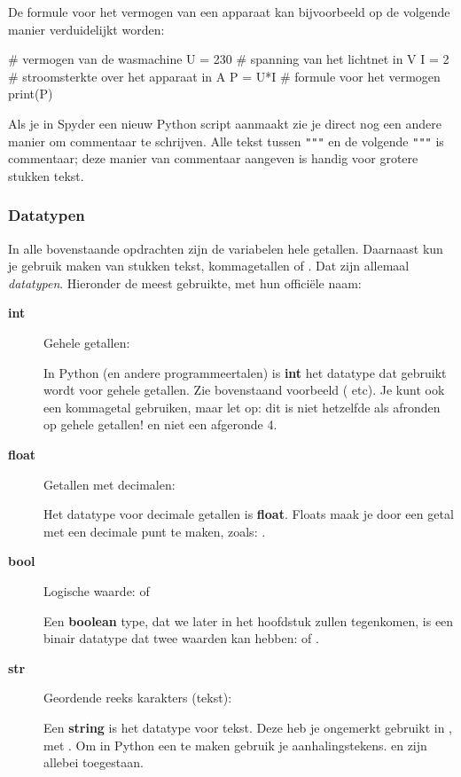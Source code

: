 \documentclass[a4paper,11pt, fleqn]{article}
\begin{document}
De formule voor het vermogen van een apparaat kan bijvoorbeeld op de volgende manier verduidelijkt worden:
\begin{python}
# vermogen van de wasmachine
U = 230	   # spanning van het lichtnet in V
I  = 2     # stroomsterkte over het apparaat in A
P = U*I    # formule voor het vermogen
print(P)
\end{python}

Als je in Spyder een nieuw Python script aanmaakt zie je direct nog een andere manier om commentaar te schrijven. Alle tekst tussen \verb,""", en de volgende \verb,""", is commentaar; deze manier van commentaar aangeven is handig voor grotere stukken tekst. 

\subsubsection{Datatypen}
In alle bovenstaande opdrachten zijn de variabelen hele getallen. Daarnaast kun je gebruik maken van stukken tekst, kommagetallen of . Dat zijn allemaal {\it datatypen}. Hieronder de meest gebruikte, met hun offici\"ele naam:

\begin{description}
\item[\textbf{int}] Gehele getallen: 

In Python (en andere programmeertalen) is {\bf int} het datatype dat gebruikt wordt voor gehele getallen. Zie bovenstaand voorbeeld ( etc). Je kunt ook een kommagetal gebruiken, maar let op: dit is niet hetzelfde als afronden op gehele getallen!  en niet een afgeronde 4.

\item[\textbf{float}] Getallen met decimalen: 

Het datatype voor decimale getallen is {\bf float}. Floats maak je door een getal met een decimale punt te maken, zoals: .

\item[\textbf{bool}] Logische waarde:  of 

Een {\bf boolean} type, dat we later in het hoofdstuk zullen tegenkomen, is een binair datatype dat twee waarden kan hebben:  of .

\item[\textbf{str}] Geordende reeks karakters (tekst): 

Een {\bf string} is het datatype voor tekst. Deze heb je ongemerkt gebruikt in , met . Om in Python een  te maken gebruik je aanhalingstekens.  en  zijn allebei toegestaan.

\end{description}
\end{document}
